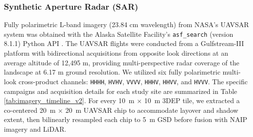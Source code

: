 \documentclass[remotesensing,article,accept,pdftex,moreauthors]{Definitions/mdpi}
\begin{document}
\subsubsection{Synthetic Aperture Radar (SAR)}
Fully polarimetric L-band imagery (23.84 cm wavelength) from NASA’s UAVSAR system was obtained with the Alaska Satellite Facility’s \texttt{asf\_search} (version 8.1.1) Python
 API \citep{alaska_search}. The UAVSAR flights were conducted from a Gulfstream-III platform with bidirectional acquisitions from opposite look directions at an average altitude of 12,495 m, providing multi-perspective radar coverage of the landscape at 6.17 m ground resolution. We utilized six fully polarimetric multi-look cross-product channels: \texttt{HHHH}, \texttt{HVHV}, \texttt{VVVV}, \texttt{HHHV}, \texttt{HHVV}, and \texttt{HVVV}. The specific campaigns and acquisition details for each study site are summarized in Table \ref{tab:imagery_timeline_v2}. For every \SI{10}{m} × \SI{10}{m} 3DEP tile, we extracted a co-centered \SI{20}{m} × \SI{20}{m} UAVSAR chip to accommodate layover and shadow extent, then bilinearly resampled each chip to \SI{5}{m} GSD before fusion with NAIP imagery and LiDAR.
\end{document}
